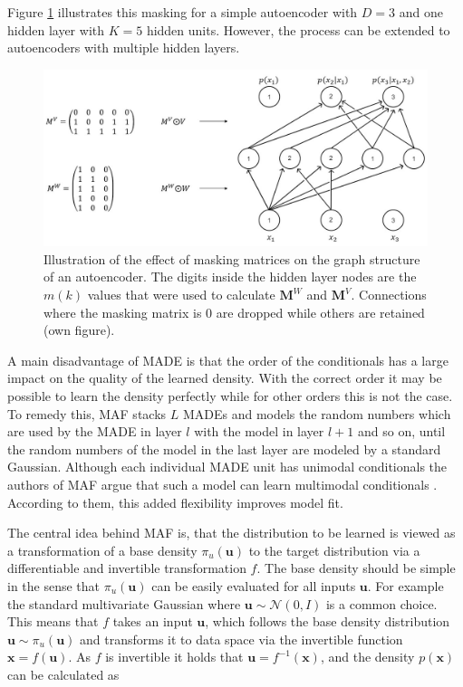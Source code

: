 \documentclass[11pt,titlepage,oneside,openany]{book}
\begin{document}
\noindent Figure \ref{fig:MADE} illustrates this masking for a simple autoencoder with $D=3$ and one hidden layer with $K=5$ hidden units. However, the process can be extended to autoencoders with multiple hidden layers.

\begin{figure}[h]
	\centering
	\includegraphics[width=\linewidth]{MADE_vis.jpg}
	\caption[Illustration of MADE]{Illustration of the effect of masking matrices on the graph structure of an autoencoder. The digits inside the hidden layer nodes are the $m(k)$ values that were used to calculate $\mathbf{M}^W$ and $\mathbf{M}^V$. Connections where the masking matrix is 0 are dropped while others are retained (own figure).}
	\label{fig:MADE}
\end{figure}

A main disadvantage of MADE is that the order of the conditionals has a large impact on the quality of the learned density. With the correct order it may be possible to learn the density perfectly while for other orders this is not the case. To remedy this, MAF stacks $L$ MADEs and models the random numbers which are used by the MADE in layer $l$ with the model in layer $l+1$ and so on, until the random numbers of the model in the last layer are modeled by a standard Gaussian. Although each individual MADE unit has unimodal conditionals the authors of MAF argue that such a model can learn multimodal conditionals \cite{papamakarios_masked_2017}. According to them, this added flexibility improves model fit.

The central idea behind MAF is, that the distribution to be learned is viewed as a transformation of a base density $\pi_{u} (\pmb{u})$ to the target distribution via a differentiable and invertible transformation $f$. The base density should be simple in the sense that $\pi_{u} (\pmb{u})$ can be easily evaluated for all inputs $\pmb{u}$. For example the standard multivariate Gaussian where $\pmb{u} \sim \mathcal{N}(0, I)$ is a common choice. This means that $f$ takes an input $\pmb{u}$, which follows the base density distribution $\pmb{u} \sim \pi_{u} (\pmb{u})$ and transforms it to data space via the invertible function $\pmb{x}=f(\pmb{u})$. As $f$ is invertible it holds that $\pmb{u} = f^{-1}(\pmb{x})$, and the density $p(\pmb{x})$ can be calculated as
\end{document}
